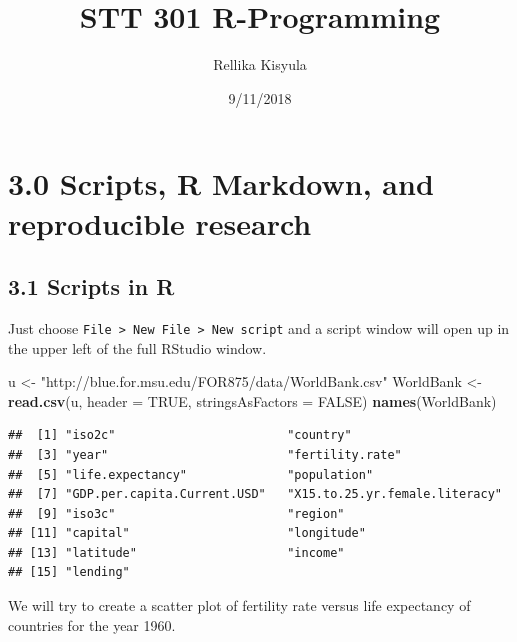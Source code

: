\documentclass[]{article}
\title{STT 301 R-Programming}
\author{Rellika Kisyula}
\date{9/11/2018}
\newenvironment{Shaded}{\begin{snugshade}}{\end{snugshade}}
\newcommand{\KeywordTok}[1]{\textcolor[rgb]{0.13,0.29,0.53}{\textbf{#1}}}
\newcommand{\DataTypeTok}[1]{\textcolor[rgb]{0.13,0.29,0.53}{#1}}
\newcommand{\DecValTok}[1]{\textcolor[rgb]{0.00,0.00,0.81}{#1}}
\newcommand{\StringTok}[1]{\textcolor[rgb]{0.31,0.60,0.02}{#1}}
\newcommand{\OtherTok}[1]{\textcolor[rgb]{0.56,0.35,0.01}{#1}}
\newcommand{\OperatorTok}[1]{\textcolor[rgb]{0.81,0.36,0.00}{\textbf{#1}}}
\newcommand{\NormalTok}[1]{#1}
\begin{document}
\maketitle

{
\setcounter{tocdepth}{2}
\tableofcontents
}
\section{3.0 Scripts, R Markdown, and reproducible
research}\label{scripts-r-markdown-and-reproducible-research}

\subsection{3.1 Scripts in R}\label{scripts-in-r}

Just choose
\texttt{File\ \textgreater{}\ New\ File\ \textgreater{}\ New\ script}
and a script window will open up in the upper left of the full RStudio
window.

\begin{Shaded}
\begin{Highlighting}[]
\NormalTok{u <-}\StringTok{ "http://blue.for.msu.edu/FOR875/data/WorldBank.csv"}
\NormalTok{WorldBank <-}\StringTok{ }\KeywordTok{read.csv}\NormalTok{(u, }\DataTypeTok{header =} \OtherTok{TRUE}\NormalTok{, }\DataTypeTok{stringsAsFactors =} \OtherTok{FALSE}\NormalTok{)}
\KeywordTok{names}\NormalTok{(WorldBank)}
\end{Highlighting}
\end{Shaded}

\begin{verbatim}
##  [1] "iso2c"                        "country"                     
##  [3] "year"                         "fertility.rate"              
##  [5] "life.expectancy"              "population"                  
##  [7] "GDP.per.capita.Current.USD"   "X15.to.25.yr.female.literacy"
##  [9] "iso3c"                        "region"                      
## [11] "capital"                      "longitude"                   
## [13] "latitude"                     "income"                      
## [15] "lending"
\end{verbatim}

We will try to create a scatter plot of fertility rate versus life
expectancy of countries for the year 1960.

\begin{Shaded}
\end{Shaded}
\end{document}
